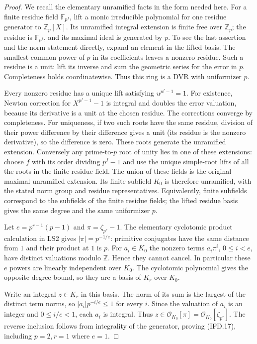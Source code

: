 \documentclass[11pt,a4paper]{article}
\numberwithin{equation}{section}
\theoremstyle{remark}\newtheorem{remark}[theorem]{Remark}
\begin{document}
\begin{proof}
We recall the elementary unramified facts in the form needed here.
For a finite residue field $\mathbb F_{p^f}$, lift a monic
irreducible polynomial for one residue generator to $\mathbb Z_p[X]$.
Its unramified integral extension is finite free over $\mathbb Z_p$;
the residue is $\mathbb F_{p^f}$, and its maximal ideal is generated
by $p$. To see the last assertion and the norm statement directly,
expand an element in the lifted basis. The smallest common power
of $p$ in its coefficients leaves a nonzero residue. Such a residue
is a unit: lift its inverse and sum the geometric series for the
error in $p$. Completeness holds coordinatewise. Thus this ring is
a DVR with uniformizer $p$.

Every nonzero residue has a unique lift satisfying $u^{p^f-1}=1$.
For existence, Newton correction for $X^{p^f-1}-1$ is integral
and doubles the error valuation, because its derivative is a unit
at the chosen residue. The corrections converge by completeness.
For uniqueness, if two such roots have the same residue, division
of their power difference by their difference gives a unit
(its residue is the nonzero derivative), so the difference is zero.
These roots generate the unramified extension. Conversely any
prime-to-$p$ root of unity lies in one of these extensions: choose
$f$ with its order dividing $p^f-1$ and use the unique simple-root
lifts of all the roots in the finite residue field. The union of
these fields is the original maximal unramified extension.
Its finite subfield $K_0$ is therefore unramified, with the stated
norm group and residue representatives. Equivalently, finite
subfields correspond to the subfields of the finite residue fields;
the lifted residue basis gives the same degree and the same
uniformizer $p$.

Let $e=p^{r-1}(p-1)$ and $\pi=\zeta_{p^r}-1$.
The elementary cyclotomic product calculation in LS2 gives
$|\pi|=p^{-1/e}$: primitive conjugates have the same distance from
$1$ and their product at $1$ is $p$. For $a_i\in K_0$ the nonzero
terms $a_i\pi^i$, $0\leq i<e$, have distinct valuations modulo
$\mathbb Z$. Hence they cannot cancel. In particular these $e$
powers are linearly independent over $K_0$. The cyclotomic
polynomial gives the opposite degree bound, so they are a basis
of $K_r$ over $K_0$.

Write an integral $z\in K_r$ in this basis. The norm of its sum is
the largest of the distinct term norms, so
$|a_i|p^{-i/e}\leq1$ for every $i$. Since the valuation of $a_i$
is an integer and $0\leq i/e<1$, each $a_i$ is integral.
Thus $z\in\mathcal O_{K_0}[\pi]=\mathcal O_{K_0}[\zeta_{p^r}]$.
The reverse inclusion follows from integrality of the generator,
proving (IFD.17), including $p=2,r=1$ where $e=1$.
\end{proof}
\end{document}
